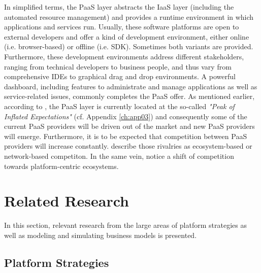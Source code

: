 In simplified terms, the \ac{PaaS} layer abstracts the \ac{IaaS} layer (including the automated resource management) and provides a runtime environment in which applications and services run. Usually, these software platforms are open to external developers and offer a kind of development environment, either online (i.e. browser-based) or offline (i.e. \ac{SDK}). Sometimes both variants are provided. Furthermore, these development environments address different stakeholders, ranging from technical developers to business people, and thus vary from comprehensive \acp{IDE} to graphical drag and drop environments. A powerful dashboard, including features to administrate and manage applications as well as service-related issues, commonly completes the \ac{PaaS} offer. As mentioned earlier, according to \citet[p. 5]{Smith2012}, the \ac{PaaS} layer is currently located at the so-called \textit{"Peak of Inflated Expectations"} (cf. Appendix \ref{ch:app03}) and consequently some of the current \ac{PaaS} providers will be driven out of the market and new \ac{PaaS} providers will emerge. Furthermore, it is to be expected that competition between \ac{PaaS} providers will increase constantly. \citet[pp. 117,128-129]{Iyer2010} describe those rivalries as ecosystem-based or network-based competiton. In the same vein, \citet[pp. 675-676]{Tiwana2010} notice a shift of competition towards platform-centric ecosystems.

\section{Related Research}\label{ch:tf:rw}

In this section, relevant research from the large areas of platform strategies as well as modeling and simulating business models is presented.

\subsection{Platform Strategies}\label{ch:tf:rw:ps}

